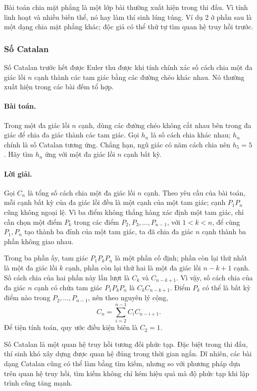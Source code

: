\documentclass[11pt]{article}
\begin{document}
Bài toán chia mặt phẳng là một lớp bài thường xuất hiện trong thi đấu. Vì
tính linh hoạt và nhiều biến thể, nó hay làm thí sinh lúng túng. Ví dụ 2 ở
phần sau là một dạng chia mặt phẳng khác; độc giả có thể thử tự tìm quan hệ
truy hồi trước.

\subsubsection{Số Catalan}

Số Catalan trước hết được Euler thu được khi tính chính xác số cách chia một
đa giác lồi \(n\) cạnh thành các tam giác bằng các đường chéo khác nhau. Nó
thường xuất hiện trong các bài đếm tổ hợp.

\paragraph{Bài toán.}
Trong một đa giác lồi \(n\) cạnh, dùng các đường chéo không cắt nhau bên
trong đa giác để chia đa giác thành các tam giác. Gọi \(h_n\) là số cách chia
khác nhau; \(h_n\) chính là số Catalan tương ứng. Chẳng hạn, ngũ giác có năm
cách chia nên \(h_5=5\). Hãy tìm \(h_n\) ứng với một đa giác lồi \(n\) cạnh
bất kỳ.

\paragraph{Lời giải.}
Gọi \(C_n\) là tổng số cách chia một đa giác lồi \(n\) cạnh. Theo yêu cầu của
bài toán, mỗi cạnh bất kỳ của đa giác lồi đều là một cạnh của một tam giác;
cạnh \(P_1P_n\) cũng không ngoại lệ. Vì ba điểm không thẳng hàng xác định một
tam giác, chỉ cần chọn một điểm \(P_k\) trong các điểm
\(P_2,P_3,\ldots,P_{n-1}\), với \(1<k<n\), để cùng \(P_1,P_n\) tạo thành ba
đỉnh của một tam giác, ta đã chia đa giác \(n\) cạnh thành ba phần không giao
nhau.

Trong ba phần ấy, tam giác \(P_1P_kP_n\) là một phần cố định; phần còn lại
thứ nhất là một đa giác lồi \(k\) cạnh, phần còn lại thứ hai là một đa giác
lồi \(n-k+1\) cạnh. Số cách chia của hai phần này lần lượt là \(C_k\) và
\(C_{n-k+1}\). Vì vậy, số cách chia của đa giác \(n\) cạnh có chứa tam giác
\(P_1P_kP_n\) là \(C_kC_{n-k+1}\). Điểm \(P_k\) có thể là bất kỳ điểm nào
trong \(P_2,\ldots,P_{n-1}\), nên theo nguyên lý cộng,
\[
  C_n=\sum_{i=2}^{n-1} C_iC_{n-i+1}.
\]
Để tiện tính toán, quy ước điều kiện biên là \(C_2=1\).

Số Catalan là một quan hệ truy hồi tương đối phức tạp. Đặc biệt trong thi đấu,
thí sinh khó xây dựng được quan hệ đúng trong thời gian ngắn. Dĩ nhiên, các
bài dạng Catalan cũng có thể làm bằng tìm kiếm, nhưng so với phương pháp dựa
trên quan hệ truy hồi, tìm kiếm không chỉ kém hiệu quả mà độ phức tạp khi lập
trình cũng tăng mạnh.
\end{document}
